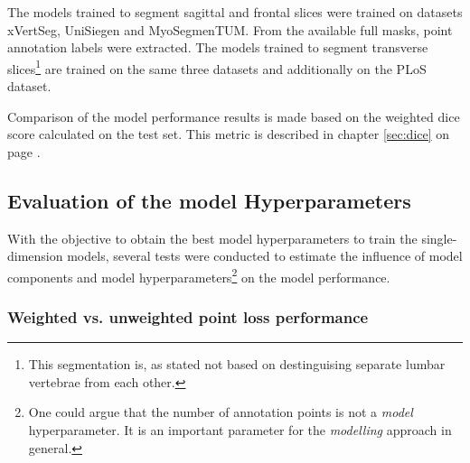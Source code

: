 \par{
    The models trained to segment sagittal and frontal slices were trained on datasets xVertSeg, UniSiegen and MyoSegmenTUM.
    From the available full masks, point annotation labels were extracted.
    The models trained to segment transverse slices\footnote{This segmentation is, as stated not based on destinguising separate lumbar vertebrae from each other.} 
    are trained on the same three datasets and additionally on the PLoS dataset.    
}
\par{
    Comparison of the model performance results is made based on the weighted dice score calculated on the test set.
    This metric is described in chapter \ref{sec:dice} on page \pageref{sec:dice}.
}


\subsection{Evaluation of the model Hyperparameters}

\par{
    With the objective to obtain the best model hyperparameters to train the single-dimension models, several tests were conducted to estimate the influence of model components and model hyperparameters\footnote{
        One could argue that the number of annotation points is not a \textit{model} hyperparameter. It is an important parameter for the \textit{modelling} approach in general.
    } on the model performance.
}

\subsubsection{Weighted vs. unweighted point loss performance}

